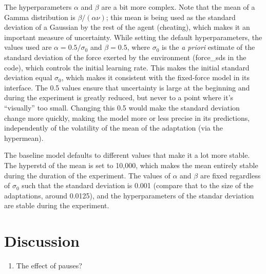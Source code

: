 \documentclass[a4paper,doc,floatsintext,natbib]{apa6}
\begin{document}
The hyperparameters $\alpha$ and $\beta$ are a bit more complex. Note that the
mean of a Gamma distribution is $\beta / (\alpha \nu)$; this mean is being used
as the standard deviation of a Gaussian by the rest of the agent (cheating),
which makes it an important measure of uncertainty. While setting the default
hyperparameters, the values used are $\alpha = 0.5 / \sigma_0$ and
$\beta = 0.5$, where $\sigma_0$ is the \textit{a priori} estimate of the
standard deviation of the force exerted by the environment (force\_sds in the
code), which controls the initial learning rate. This makes the initial
standard deviation equal $\sigma_0$, which makes it consistent with the
fixed-force model in its interface. The 0.5 values ensure that uncertainty is
large at the beginning and during the experiment is greatly reduced, but never
to a point where it's ``visually'' too small. Changing this 0.5 would make the
standard deviation change more quickly, making the model more or less precise
in its predictions, independently of the volatility of the mean of the
adaptation (via the hypermean).

The baseline model defaults to different values that make it a lot more
stable. The hyperstd of the mean is set to 10,000, which makes the mean
entirely stable during the duration of the experiment. The values of $\alpha$
and $\beta$ are fixed regardless of $\sigma_0$ such that the standard deviation
is 0.001 (compare that to the size of the adaptations, around 0.0125), and the
hyperparameters of the standar deviation are stable during the experiment.



\section{Discussion}
\begin{enumerate}
\item The effect of pauses?
\end{enumerate}




\end{document}
